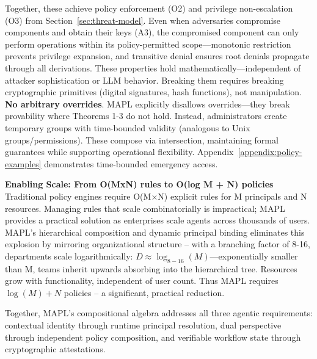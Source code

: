 Together, these achieve policy enforcement (O2) and privilege non-escalation (O3) from Section~\ref{sec:threat-model}. Even when adversaries compromise components and obtain their keys (A3), the compromised component can only perform operations within its policy-permitted scope—monotonic restriction prevents privilege expansion, and transitive denial ensures root denials propagate through all derivations. These properties hold mathematically—independent of attacker sophistication or LLM behavior. Breaking them requires breaking cryptographic primitives (digital signatures, hash functions), not manipulation.
\textbf{No arbitrary overrides}. MAPL explicitly disallows overrides—they break provability where Theorems 1-3 do not hold. Instead, administrators create temporary groups with time-bounded validity (analogous to Unix groups/permissions). These compose via intersection, maintaining formal guarantees while supporting operational flexibility. Appendix~\ref{appendix:policy-examples} demonstrates time-bounded emergency access.

\noindent\textbf{Enabling Scale: From O(MxN) rules to O(log M + N) policies}
\label{sec:practical-policy}
Traditional policy engines require O(M×N) explicit rules for M principals and N resources. 
Managing rules that scale combinatorially is impractical; MAPL provides a practical solution as enterprises scale agents across thousands of users.
MAPL's hierarchical composition and dynamic principal binding eliminates this explosion by mirroring organizational structure -- with a branching factor of 8-16, departments scale logarithmically: $D \approx \log_{8-16}(M)$—exponentially smaller than M, teams inherit upwards absorbing into the hierarchical tree. Resources grow with functionality, independent of user count. Thus MAPL requires $\log(M) + N$ policies -- a significant, practical reduction.


Together, MAPL's compositional algebra addresses all three agentic requirements: contextual identity through runtime principal resolution, dual perspective through independent policy composition, and verifiable workflow state through cryptographic attestations.
